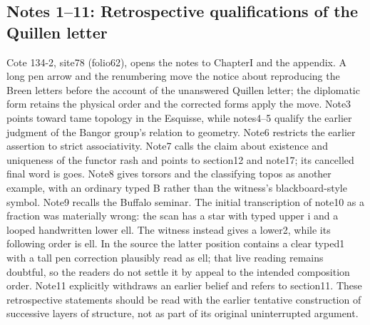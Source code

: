 \documentclass[10pt,oneside]{book}
\begin{document}
\subsection*{Notes 1--11: Retrospective qualifications of the Quillen letter}
Cote 134-2, site78 (folio62), opens the notes to ChapterI and the appendix. A long pen arrow and the renumbering move the notice about reproducing the Breen letters before the account of the unanswered Quillen letter; the diplomatic form retains the physical order and the corrected forms apply the move. Note3 points toward tame topology in the Esquisse, while notes4--5 qualify the earlier judgment of the Bangor group's relation to geometry. Note6 restricts the earlier assertion to strict associativity. Note7 calls the claim about existence and uniqueness of the functor rash and points to section12 and note17; its cancelled final word is goes. Note8 gives torsors and the classifying topos as another example, with an ordinary typed B rather than the witness's blackboard-style symbol. Note9 recalls the Buffalo seminar. The initial transcription of note10 as a fraction was materially wrong: the scan has a star with typed upper i and a looped handwritten lower ell. The witness instead gives a lower2, while its following order is ell. In the source the latter position contains a clear typed1 with a tall pen correction plausibly read as ell; that live reading remains doubtful, so the readers do not settle it by appeal to the intended composition order. Note11 explicitly withdraws an earlier belief and refers to section11. These retrospective statements should be read with the earlier tentative construction of successive layers of structure, not as part of its original uninterrupted argument.
\end{document}
